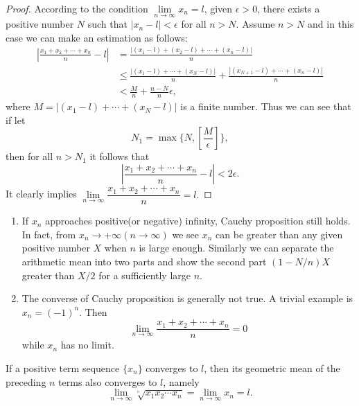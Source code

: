 \documentclass[11pt,fleqn]{book} %
\begin{document}
\begin{proof}
	According to the condition $\lim\limits_{n\to\infty}x_n=l$, given $\epsilon>0$, there exists a positive number $N$ such that $|x_n-l|<\epsilon$ for all $n>N$. Assume $n>N$ and in this case we can make an estimation as follows:
	\begin{align*}
	\left|\frac{x_1+x_2+\cdots+x_n}{n}-l\right|
	&=\frac{\left|(x_1-l)+(x_2-l)+\cdots+(x_n-l)\right|}{n}\\
	&\leqslant\frac{\left|(x_1-l)+\cdots+(x_N-l)\right|}{n}+\frac{\left|(x_{N+1}-l)+\cdots+(x_n-l)\right|}{n}\\
	&<\frac{M}{n}+\frac{n-N}{n}\epsilon,
	\end{align*}
    where $M=\left|(x_1-l)+\cdots+(x_N-l)\right|$ is a finite number. Thus we can see that if let
	\[
	N_1=\max\{N,\left[\frac{M}{\epsilon}\right]\},
	\]
	then for all $n>N_1$ it follows that
	\[
		\left|\frac{x_1+x_2+\cdots+x_n}{n}-l\right|<2\epsilon.
	\]
	It clearly implies $
	\lim\limits_{n\to\infty}\dfrac{x_1+x_2+\cdots+x_n}{n}=l.
$

\end{proof}

\begin{remark}
    \begin{enumerate}
    \item
	If $x_n$ approaches positive(or negative) infinity, Cauchy proposition still holds. In fact, from $x_n\to+\infty(n\to\infty)$ we see $x_n$ can be greater than any given positive number $X$ when $n$ is large enough. Similarly we can separate the arithmetic mean into two parts and show the second part $(1-N/n)X$ greater than $X/2$ for a sufficiently large $n$.\\
	\item
	The converse of Cauchy proposition is generally not true. A trivial example is $x_n=(-1)^n$. Then
	\[
	\lim\limits_{n\to\infty}\frac{x_1+x_2+\cdots+x_n}{n}=0
	\]
	while $x_n$ has no limit.
    \end{enumerate}
\end{remark}
\vspace{3mm}
\begin{corollary}
	If a positive term sequence $\{x_n\}$ converges to $l$, then its geometric mean of the preceding $n$ terms also converges to $l$, namely
	\begin{equation}
	\lim\limits_{n\to\infty}\sqrt[^n]{x_1x_2\cdots x_n}=\lim\limits_{n\to\infty}x_n=l.
	\end{equation}
\end{corollary}
\end{document}
